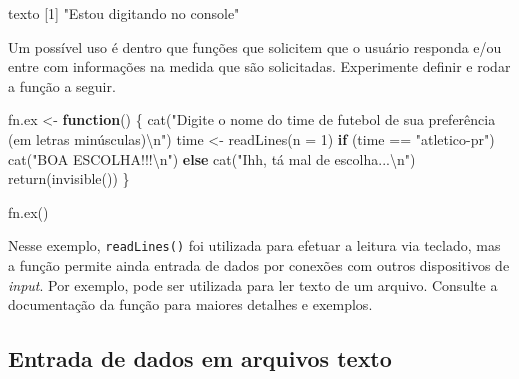 \documentclass[
  10pt,
  a4paper]{book}
\newenvironment{Shaded}{\begin{snugshade}}{\end{snugshade}}
\newcommand{\AttributeTok}[1]{\textcolor[rgb]{0.77,0.63,0.00}{#1}}
\newcommand{\ControlFlowTok}[1]{\textcolor[rgb]{0.13,0.29,0.53}{\textbf{#1}}}
\newcommand{\DecValTok}[1]{\textcolor[rgb]{0.00,0.00,0.81}{#1}}
\newcommand{\FunctionTok}[1]{\textcolor[rgb]{0.00,0.00,0.00}{#1}}
\newcommand{\NormalTok}[1]{#1}
\newcommand{\OtherTok}[1]{\textcolor[rgb]{0.56,0.35,0.01}{#1}}
\newcommand{\SpecialCharTok}[1]{\textcolor[rgb]{0.00,0.00,0.00}{#1}}
\newcommand{\StringTok}[1]{\textcolor[rgb]{0.31,0.60,0.02}{#1}}
\begin{document}
\begin{Shaded}
\begin{Highlighting}[]
\NormalTok{texto}
\NormalTok{[}\DecValTok{1}\NormalTok{] }\StringTok{"Estou digitando no console"}
\end{Highlighting}
\end{Shaded}

Um possível uso é dentro que funções que solicitem que o usuário
responda e/ou entre com informações na medida que são
solicitadas. Experimente definir e rodar a função a seguir.

\begin{Shaded}
\begin{Highlighting}[]
\NormalTok{fn.ex }\OtherTok{\textless{}{-}} \ControlFlowTok{function}\NormalTok{() \{}
    \FunctionTok{cat}\NormalTok{(}\StringTok{"Digite o nome do time de futebol de sua preferência (em letras minúsculas)}\SpecialCharTok{\textbackslash{}n}\StringTok{"}\NormalTok{)}
\NormalTok{    time }\OtherTok{\textless{}{-}} \FunctionTok{readLines}\NormalTok{(}\AttributeTok{n =} \DecValTok{1}\NormalTok{)}
    \ControlFlowTok{if}\NormalTok{ (time }\SpecialCharTok{==} \StringTok{"atletico{-}pr"}\NormalTok{)}
        \FunctionTok{cat}\NormalTok{(}\StringTok{"BOA ESCOLHA!!!}\SpecialCharTok{\textbackslash{}n}\StringTok{"}\NormalTok{)}
    \ControlFlowTok{else} \FunctionTok{cat}\NormalTok{(}\StringTok{"Ihh, tá mal de escolha...}\SpecialCharTok{\textbackslash{}n}\StringTok{"}\NormalTok{)}
    \FunctionTok{return}\NormalTok{(}\FunctionTok{invisible}\NormalTok{())}
\NormalTok{\}}
\end{Highlighting}
\end{Shaded}

\begin{Shaded}
\begin{Highlighting}[]
\FunctionTok{fn.ex}\NormalTok{()}
\end{Highlighting}
\end{Shaded}

Nesse exemplo, \texttt{readLines()} foi utilizada para efetuar a leitura via
teclado, mas a função permite ainda entrada de dados por conexões com
outros dispositivos de \emph{input}. Por exemplo, pode ser utilizada para ler
texto de um arquivo. Consulte a documentação da função para maiores
detalhes e exemplos.

\hypertarget{entrada-de-dados-em-arquivos-texto}{%
\subsection{Entrada de dados em arquivos texto}\label{entrada-de-dados-em-arquivos-texto}}
\end{document}
